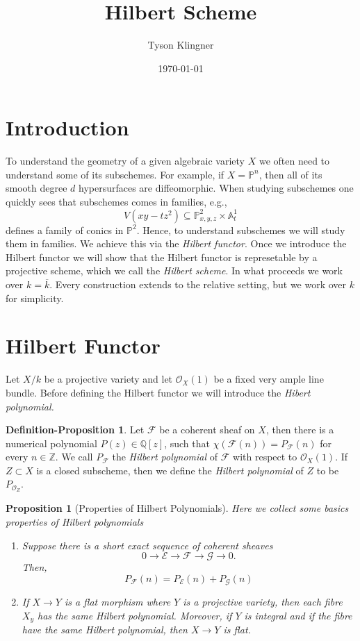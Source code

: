 \documentclass[12pt]{amsart}
\newtheorem{proposition}[theorem]{Proposition}
\numberwithin{equation}{section}
\theoremstyle{definition}
\newtheorem{defprop}[theorem]{Definition-Proposition}
\newcommand{\cG}{\mathcal{G}}
\renewcommand{\AA}{\mathbb{A}}
\newcommand{\ZZ}{\mathbb{Z}}
\newcommand{\PP}{\mathbb{P}}
\renewcommand{\AA}{\mathbb{A}}
\newcommand{\QQ}{\mathbb{Q}}
\newcommand{\cF}{\mathcal{F}}
\newcommand{\cE}{\mathcal{E}}
\let\bar\overline
\begin{document}
\title{Hilbert Scheme}

\author{Tyson Klingner}


\date{\today}  %

\maketitle 

\section{Introduction}

To understand the geometry of a given algebraic variety $X$ we often need to understand some of its subschemes. 
For example, if $X = \PP^n$, then all of its smooth degree $d$ hypersurfaces are diffeomorphic. 
When studying subschemes one quickly sees that subschemes comes in families, e.g.,
\[
V(xy-tz^2) \subseteq \PP^2_{x,y,z} \times \AA^1_t
\]
defines a family of conics in $\PP^2.$
Hence, to understand subschemes we will study them in families. 
We achieve this via the {\em Hilbert functor}. 
Once we introduce the Hilbert functor we will show that the Hilbert functor is represetable by a projective scheme, which we call the {\em Hilbert scheme}.
In what proceeds we work over $k= \bar{k}$. 
Every construction extends to the relative setting, but we work over $k$ for simplicity.

\section{Hilbert Functor}

Let $X/k$ be a projective variety and let $\mathcal{O}_X(1)$ be a fixed very ample line bundle. Before defining the Hilbert functor we will introduce the {\em Hibert polynomial.}

\begin{defprop}
Let $\cF$ be a coherent sheaf on $X$, then there is a numerical polynomial $P(z) \in \QQ[z]$, such that $\chi(\cF(n)) = P_{\cF}(n)$ for every $n \in \ZZ.$
We call $P_{\cF}$ the {\em Hilbert polynomial} of $\cF$ with respect to $\mathcal{O}_X(1).$
If $Z \subset X$ is a closed subscheme, then we define the {\em Hilbert polynomial} of $Z$ to be $P_{\mathcal{O}_Z}.$
\end{defprop}

\begin{proposition}[Properties of Hilbert Polynomials]
    Here we collect some basics properties of Hilbert polynomials
\begin{enumerate}
    \item Suppose there is a short exact sequence of coherent sheaves
    \[
    0 \to \cE \to \cF \to \cG \to 0.
    \]
    Then, 
    \[
    P_{\cF}(n) = P_{\cE}(n) + P_{\cG}(n)
    \]
    \item If $X\to Y$ is a flat morphism where $Y$ is a projective variety, then each fibre $X_y$ has the same Hilbert polynomial.
    Moreover, if $Y$ is integral and if the fibre have the same Hilbert polynomial, then $X \to Y$ is flat.
\end{enumerate}
\end{proposition}  
\end{document}
